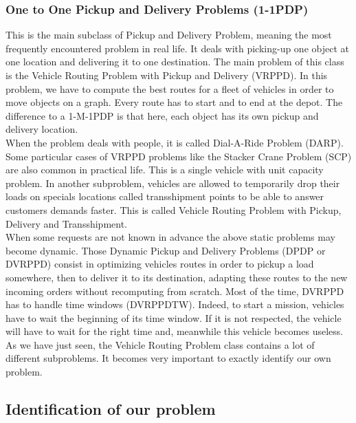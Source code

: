 \documentclass[journal]{IEEEtran}
\begin{document}
\subsubsection{One to One Pickup and Delivery Problems (1-1PDP) }

This is the main subclass of Pickup and Delivery Problem, meaning the most
frequently encountered problem in real life. It deals with picking-up one object
at one location and delivering it to one destination. The main problem of this
class is the Vehicle Routing Problem with Pickup and Delivery (VRPPD). In this
problem, we have to compute the best routes for a fleet of vehicles in order to
move objects on a graph. Every route has to start and to end at the depot. The difference to a 1-M-1PDP is that here, each object has its own pickup and delivery location.\\%

When the problem deals with people, it is called Dial-A-Ride Problem (DARP).
Some particular cases of VRPPD problems like the Stacker Crane Problem (SCP) are
also common in practical life. This is a single vehicle with unit capacity
problem. In another subproblem, vehicles are allowed to temporarily drop their
loads on specials locations called transshipment points to be able to answer customers demands faster. This is called Vehicle Routing Problem with Pickup, Delivery and Transshipment.\\

When some requests are not known in advance the above static problems may
become dynamic. Those Dynamic Pickup and Delivery Problems \cite{Mitrovic01,Mitrovic04,Mitrovic98} (DPDP or DVRPPD) consist in optimizing
vehicles routes in order to pickup a load somewhere, then to deliver it to its
destination, adapting these routes to the new incoming orders without
recomputing from scratch. Most of the time, DVRPPD has to handle time windows
(DVRPPDTW). Indeed, to start a mission, vehicles have to wait the beginning of
its time window. If it is not respected, the vehicle will have to wait for the
right time and, meanwhile this vehicle becomes useless.\\

As we have just seen, the Vehicle Routing Problem class contains a lot of
different subproblems. It becomes very important to exactly identify our own
problem.

\subsection{Identification of our problem}
\end{document}
